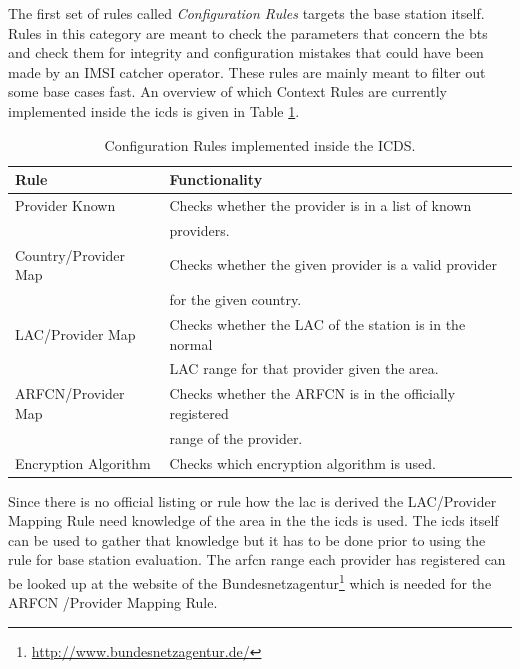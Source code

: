 The first set of rules called \emph{Configuration Rules} targets the base station itself.
Rules in this category are meant to check the parameters that concern the \gls{bts} and check them for integrity and configuration mistakes that could have been made by an IMSI catcher operator.
These rules are mainly meant to filter out some base cases fast.
An overview of which Context Rules are currently implemented inside the \gls{icds} is given in Table \ref{tab:config_rules}.
\begin{table}
\centering
\begin{tabular}{ll}
\toprule
Rule					&Functionality\\
\midrule
Provider Known			&Checks whether the provider is in a list of known \\
						&providers.\\
Country/Provider Map	&Checks whether the given provider is a valid provider\\
						&for the given country.\\
LAC/Provider Map		&Checks whether the LAC of the station is in the normal\\
						&LAC range for that provider given the area.\\
ARFCN/Provider Map		&Checks whether the ARFCN is in the officially registered\\
						&range of the provider.\\
Encryption Algorithm	&Checks which encryption algorithm is used.\\
\bottomrule
\end{tabular}
\caption{Configuration Rules implemented inside the ICDS.}
\label{tab:config_rules}
\end{table}
Since there is no official listing or rule how the \gls{lac} is derived the LAC/Provider Mapping Rule need knowledge of the area in the the \gls{icds} is used.
The \gls{icds} itself can be used to gather that knowledge but it has to be done prior to using the rule for base station evaluation.
The \gls{arfcn} range each provider has registered can be looked up at the website of the Bundesnetzagentur\footnote{\url{http://www.bundesnetzagentur.de/}} which is needed for the ARFCN /Provider Mapping Rule.

